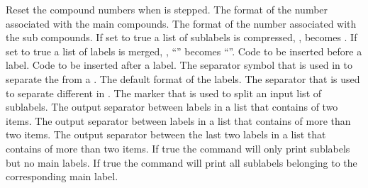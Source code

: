 \documentclass[load-preamble+,babel-options={ngerman,british,american}]{cnltx-doc}
\begin{document}
\begin{options}
    Reset the compound numbers when  is stepped.
    The format of the number associated with the main compounds.
    The format of the number associated with the sub compounds.
    If set to true a list of sublabels is compressed, \ie,
     becomes
    .
    If set to true a list of labels is merged, \ie,
    ``'' becomes ``''.
  \Default
    Code to be inserted before a label.
  \Default
    Code to be inserted after a label.
    The separator symbol that is used in  to separate the  from a .
    The default format of the labels.
  \Default{,}
    The separator that is used to separate different  in
    .
  \Default{,}
    The marker that is used to split an input list of sublabels.
    The output separator between labels in a list that contains of two items.
  \Default{\visualizespaces{, }}
    The output separator between labels in a list that contains of more than
    two items.
    The output separator between the last two labels in a list that contains
    of more than two items.
    If true the command  will only print sublabels but no main
    labels.
    If true the command  will print all sublabels belonging to the
    corresponding main label.
  \Default{,}

\end{options}
\end{document}
